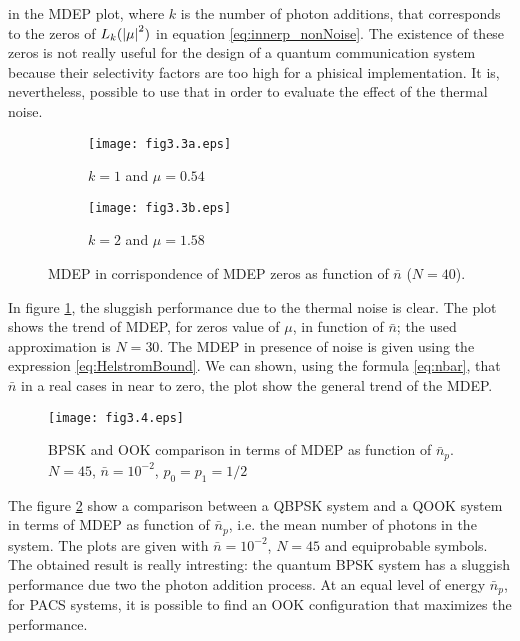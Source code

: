     in the MDEP plot, where $k$ is the number of photon additions, that corresponds to the zeros
    of $L_k(\absolutevalue{\mu}^2)$ in equation \ref{eq:innerp_nonNoise}.
    The existence of these zeros is not really useful for the design of a quantum communication
    system because their selectivity factors are too high for a phisical implementation. It is, 
    nevertheless, possible to use that in order to evaluate the effect of the thermal noise.
    \begin{figure}[t]
        \begin{subfigure}{0.5\textwidth}
            \texttt{[image: fig3.3a.eps]}
            \caption{$k=1$ and $\mu = 0.54$}
        \end{subfigure}
        \begin{subfigure}{0.5\textwidth}
            \texttt{[image: fig3.3b.eps]}
            \caption{$k=2$ and $\mu = 1.58$}
        \end{subfigure}
        \caption{MDEP in corrispondence of MDEP zeros as function of $\bar{n}$ ($N=40$).}
        \label{fig:3.3}
    \end{figure}
    In figure \ref{fig:3.3}, the sluggish performance due to the thermal noise is clear. The plot
    shows the trend of MDEP, for zeros value of $\mu$, in function of $\bar{n}$; the used approximation
    is $N=30$. The MDEP in presence of noise is given using the expression \ref{eq:HelstromBound}.
    We can shown, using the formula \ref{eq:nbar}, that $\bar{n}$ in a real cases in near to zero, the 
    plot show the general trend of the MDEP.

    \begin{figure}[t]
        \texttt{[image: fig3.4.eps]}
        \caption{BPSK and OOK comparison in terms of MDEP as function of $\bar{n}_p$. \\$N=45$, $\bar{n}=10^{-2}$, $p_0=p_1=1/2$}
        \label{fig:3.4}
    \end{figure}
    
    The figure \ref{fig:3.4} show a comparison between a QBPSK system and a QOOK system in terms of 
    MDEP as function of $\bar{n}_p$, i.e. the mean number of photons in the system. 
    The plots are given with $\bar{n}= 10^{-2}$, $N=45$ and equiprobable symbols.
    The obtained result is really intresting: the quantum BPSK system has a sluggish performance due two 
    the photon addition process. At an equal level of energy $\bar{n}_p$, for PACS systems, it is
    possible to find an OOK configuration that maximizes the performance.
    